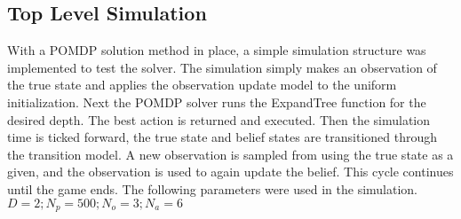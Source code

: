 \break
\subsection{Top Level Simulation}
	With a POMDP solution method in place, a simple simulation structure was implemented to test the solver.  The simulation simply makes an observation of the true state and applies the observation update model to the uniform initialization.  Next the POMDP solver runs the ExpandTree function for the desired depth.  The best action is returned and executed.  Then the simulation time is ticked forward, the true state and belief states are transitioned through the transition model.  A new observation is sampled from using the true state as a given, and the observation is used to again update the belief.  This cycle continues until the game ends. The following parameters were used in the simulation.\\
	$D = 2 ; N_p = 500 ; N_o = 3 ; N_a = 6 $
	